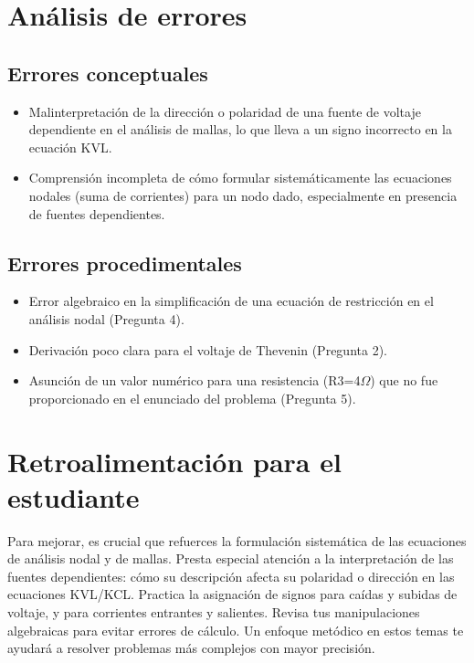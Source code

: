 \documentclass[11pt,a4paper]{article}
\begin{document}
\begin{longtable}{>{\bfseries}p{2.8cm} p{1.6cm} p{7.0cm} p{2.8cm}}
    \midrule
\end{longtable}

\section*{Análisis de errores}

\subsection*{Errores conceptuales}
\begin{itemize}[leftmargin=1.5em, itemsep=2pt]
  \item Malinterpretación de la dirección o polaridad de una fuente de voltaje dependiente en el análisis de mallas, lo que lleva a un signo incorrecto en la ecuación KVL.
  \item Comprensión incompleta de cómo formular sistemáticamente las ecuaciones nodales (suma de corrientes) para un nodo dado, especialmente en presencia de fuentes dependientes.
\end{itemize}

\subsection*{Errores procedimentales}
\begin{itemize}[leftmargin=1.5em, itemsep=2pt]
  \item Error algebraico en la simplificación de una ecuación de restricción en el análisis nodal (Pregunta 4).
  \item Derivación poco clara para el voltaje de Thevenin (Pregunta 2).
  \item Asunción de un valor numérico para una resistencia (R3=4$\Omega$) que no fue proporcionado en el enunciado del problema (Pregunta 5).
\end{itemize}

\section*{Retroalimentación para el estudiante}
\begin{tcolorbox}[cajaRecomendacion, title={Dirigido a: Saul Astudillo}]
Para mejorar, es crucial que refuerces la formulación sistemática de las ecuaciones de análisis nodal y de mallas. Presta especial atención a la interpretación de las fuentes dependientes: cómo su descripción afecta su polaridad o dirección en las ecuaciones KVL/KCL. Practica la asignación de signos para caídas y subidas de voltaje, y para corrientes entrantes y salientes. Revisa tus manipulaciones algebraicas para evitar errores de cálculo. Un enfoque metódico en estos temas te ayudará a resolver problemas más complejos con mayor precisión.
\end{tcolorbox}
\end{document}
